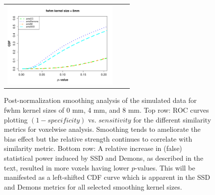 \documentclass[final,5p,times,twocolumn]{elsarticle}
\begin{document}
\begin{figure}
\begin{center}
\begin{tabular}{ccc}
  \includegraphics[width=57mm]{ISV_CDFAlreadyAlignedSmooth1.pdf} \\
\end{tabular}
\caption{Post-normalization smoothing analysis of the simulated data for
fwhm kernel sizes of 0 mm, 4 mm, and 8 mm.  Top row:  
ROC curves plotting $(1 - specificity)$ vs. $sensitivity$ for the
different similarity metrics for voxelwise analysis.  Smoothing
tends to ameliorate the bias effect but the relative strength
continues to correlate with similarity metric.  Bottom row:
A relative 
increase in (false) statistical power induced by SSD and Demons, as 
described in the text, resulted in more voxels having lower 
$p$-values.  This will be manifested as a left-shifted CDF 
curve which is apparent in the SSD and Demons metrics for all selected smoothing kernel sizes.
}
\label{fig:simulated_plots_smooth}
\end{center}        
\end{figure}
\end{document}
